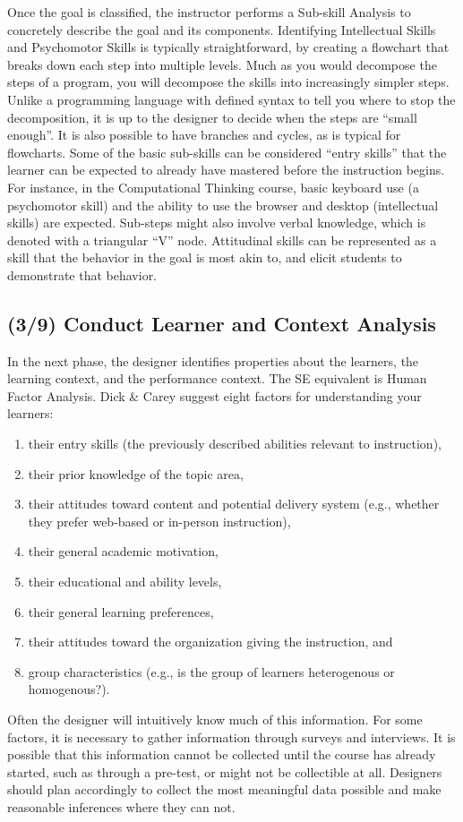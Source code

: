 Once the goal is classified, the instructor performs a Sub-skill Analysis to concretely describe the goal and its components. 
Identifying Intellectual Skills and Psychomotor Skills is typically straightforward, by creating a flowchart that breaks down each step into multiple levels.
Much as you would decompose the steps of a program, you will decompose the skills into increasingly simpler steps.
Unlike a programming language with defined syntax to tell you where to stop the decomposition, it is up to the designer to decide when the steps are ``small enough''.
It is also possible to have branches and cycles, as is typical for flowcharts.
Some of the basic sub-skills can be considered ``entry skills'' that the learner can be expected to already have mastered before the instruction begins.
For instance, in the Computational Thinking course, basic keyboard use (a psychomotor skill) and the ability to use the browser and desktop (intellectual skills) are expected. 
Sub-steps might also involve verbal knowledge, which is denoted with a triangular ``V'' node. 
Attitudinal skills can be represented as a skill that the behavior in the goal is most akin to, and elicit students to demonstrate that behavior.

\subsection{(3/9) Conduct Learner and Context Analysis}

In the next phase, the designer identifies properties about the learners, the learning context, and the performance context. The SE equivalent is Human Factor Analysis.
Dick \& Carey suggest eight factors for understanding your learners:
\begin{enumerate}
\item their entry skills (the previously described abilities relevant to instruction),
\item their prior knowledge of the topic  area,
\item their attitudes toward content and potential delivery system (e.g., whether they prefer web-based or in-person instruction),
\item their general academic motivation,
\item their educational and ability levels,
\item their general learning preferences,
\item their attitudes toward the organization giving the instruction, and
\item group characteristics (e.g., is the group of learners heterogenous or homogenous?).
\end{enumerate}
Often the designer will intuitively know much of this information.
For some factors, it is necessary to gather information through surveys and interviews.
It is possible that this information cannot be collected until the course has already started, such as through a pre-test, or might not be collectible at all.
Designers should plan accordingly to collect the most meaningful data possible and make reasonable inferences where they can not.

